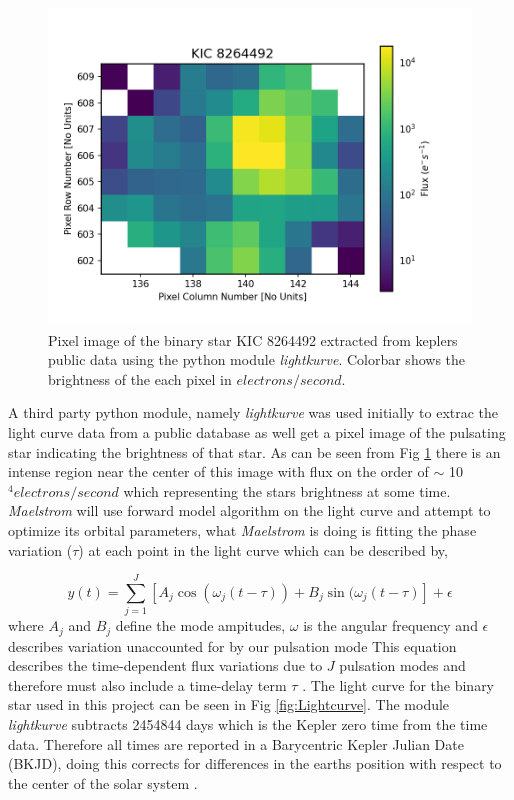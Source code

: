 \documentclass[]{article}
\begin{document}
\begin{figure}[H]
    \centering
    \includegraphics[width=1\linewidth]{Recover_Binary.png}
    \caption{Pixel image of the binary star KIC 8264492 extracted from keplers public data using the python module \textit{lightkurve}. Colorbar shows the brightness of the each pixel in $electrons / second$.}
    \label{fig:Recover_Binary}
\end{figure}


A third party python module, namely  \textit{lightkurve} was used initially to extrac the light curve data from a public database as well get a pixel image of the pulsating star indicating the brightness of that star. 
As can be seen from Fig \ref{fig:Recover_Binary} there is an intense region near the center of this image with flux on the order of $\sim$ 10$^4 electrons/second$ which representing the stars brightness at some time. 
\textit{Maelstrom} will use forward model algorithm on the light curve and attempt to optimize its orbital parameters, what \textit{Maelstrom} is doing is fitting the phase variation ($\tau$) at each point in the light curve which can be described by,

\begin{equation}
    y(t) = \sum_{j = 1}^{J} [A_j \cos(\omega_j (t - \tau)) + B_j \sin(\omega_j (t - \tau) ] + \epsilon
\label{eq:PhaseVariation}    
\end{equation}
where $A_j$ and $B_j$ define the mode ampitudes, $\omega$ is the angular frequency and $\epsilon$ describes variation unaccounted for by our pulsation mode
This equation describes the time-dependent flux variations due to $J$ pulsation modes and therefore must also include a time-delay term $\tau$ \cite{hey2020forward}.
\noindent
The light curve for the binary star used in this project can be seen in Fig \ref{fig:Lightcurve}.
The module \textit{lightkurve} subtracts 2454844 days which is the Kepler zero time from the time data. 
Therefore all times are reported in a Barycentric Kepler Julian Date (BKJD), doing this corrects for differences in the earths position with respect to the center of the solar system \cite{Eastman_2010}. 
\end{document}

